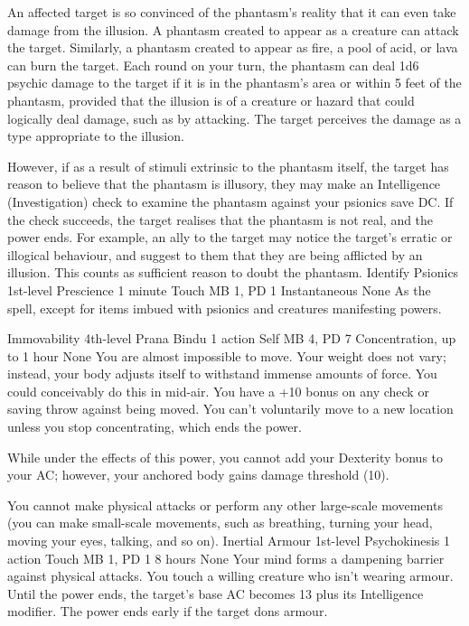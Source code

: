 An affected target is so convinced of the phantasm's reality
that it can even take damage from the illusion.
A phantasm created to appear as a creature can attack the target.
Similarly, a phantasm created to appear as fire, a pool of acid,
or lava can burn the target. Each round on your turn,
the phantasm can deal 1d6 psychic damage to the target
if it is in the phantasm's area or within 5 feet of the phantasm,
provided that the illusion is of a creature or hazard
that could logically deal damage, such as by attacking.
The target perceives the damage as a type appropriate to the illusion.

However, if as a result of stimuli extrinsic to the phantasm itself,
the target has reason to believe that the phantasm is illusory, 
they may make an Intelligence (Investigation) check to examine the phantasm
against your psionics save DC.
If the check succeeds, the target realises that the phantasm is not real,
and the power ends.
For example, an ally to the target may notice the target's erratic or
illogical behaviour, and suggest to them that they are being afflicted
by an illusion. This counts as sufficient reason to doubt the phantasm.
\DndPowerHeader%
    {Identify Psionics\label{pwr:identify_psionics}}
    {1st-level Prescience}
    {1 minute}
    {Touch}
    {MB 1, PD 1}
    {Instantaneous}
    {None}
As the  spell, except for
items imbued with psionics and creatures manifesting powers.

\DndPowerHeader%
    {Immovability\label{pwr:immovability}}
    {4th-level Prana Bindu}
    {1 action}
    {Self}
    {MB 4, PD 7}
    {Concentration, up to 1 hour}
    {None}
You are almost impossible to move.
Your weight does not vary;
instead, your body adjusts itself to withstand immense amounts
of force. You could conceivably do this in mid-air. You have
a +10 bonus on any check or saving throw against being moved.
You can't voluntarily move to a new location unless you stop
concentrating, which ends the power.

While under the effects of this power, you cannot add your
Dexterity bonus to your AC; however, your anchored body gains
damage threshold (10).

You cannot make physical attacks or perform any other large-scale
movements (you can make small-scale movements, such as breathing,
turning your head, moving your eyes, talking, and so on).
\DndPowerHeader%
    {Inertial Armour\label{pwr:inertial_armour}}
    {1st-level Psychokinesis}
    {1 action}
    {Touch}
    {MB 1, PD 1}
    {8 hours}
    {None}
Your mind forms a dampening barrier against physical attacks.
You touch a willing creature who isn't wearing armour.
Until the power ends, the target's base AC becomes 13
plus its Intelligence modifier.
The power ends early if the target dons armour.

